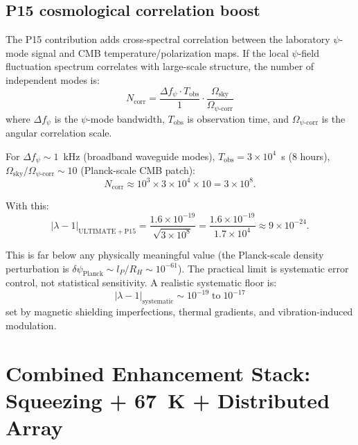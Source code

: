 \documentclass[11pt]{article}
\theoremstyle{definition}
\theoremstyle{remark}
\newcommand{\dpsi}{\delta\psi}
\newcommand{\lam}{\lambda}
\begin{document}
\subsection{P15 cosmological correlation boost}

The P15 contribution adds cross-spectral correlation between the
laboratory $\psi$-mode signal and CMB temperature/polarization maps.
If the local $\psi$-field fluctuation spectrum correlates with
large-scale structure, the number of independent modes is:
\begin{equation}
N_{\mathrm{corr}} = \frac{\Delta f_{\psi}\cdot T_{\mathrm{obs}}}
{1}\cdot\frac{\Omega_{\mathrm{sky}}}{\Omega_{\psi\text{-corr}}}
\end{equation}
where $\Delta f_\psi$ is the $\psi$-mode bandwidth, $T_{\mathrm{obs}}$
is observation time, and $\Omega_{\psi\text{-corr}}$ is the angular
correlation scale.

For $\Delta f_\psi \sim 1$~kHz (broadband waveguide modes),
$T_{\mathrm{obs}} = 3\times10^4$~s (8 hours),
$\Omega_{\mathrm{sky}}/\Omega_{\psi\text{-corr}} \sim 10$ (Planck-scale
CMB patch):
\begin{equation}
N_{\mathrm{corr}} \approx 10^3\times3\times10^4\times10 = 3\times10^8.
\end{equation}

With this:
\begin{equation}
|\lam-1|_{\mathrm{ULTIMATE+P15}} =
\frac{1.6\times10^{-19}}{\sqrt{3\times10^8}}
= \frac{1.6\times10^{-19}}{1.7\times10^4}
\approx 9\times10^{-24}.
\end{equation}

This is far below any physically meaningful value (the Planck-scale
density perturbation is $\dpsi_{\mathrm{Planck}} \sim l_P/R_H
\sim 10^{-61}$). The practical limit is systematic error control, not
statistical sensitivity. A realistic systematic floor is:
\begin{equation}
\boxed{
|\lam-1|_{\mathrm{systematic}} \sim 10^{-19}\;\text{to}\;10^{-17}
}
\end{equation}
set by magnetic shielding imperfections, thermal gradients, and
vibration-induced modulation.


\section{Combined Enhancement Stack: Squeezing + 67~K + Distributed Array}
\label{sec:combined-stack}
\end{document}
